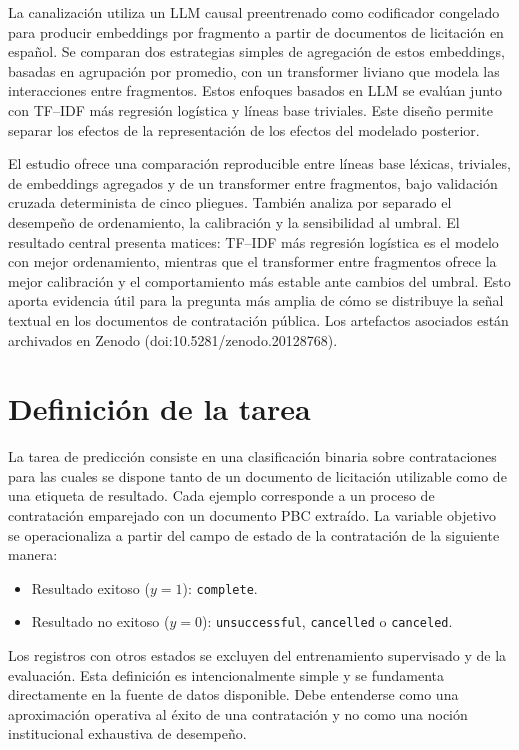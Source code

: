 La canalización utiliza un LLM causal preentrenado como codificador congelado para producir embeddings por fragmento a partir de documentos de licitación en español. Se comparan dos estrategias simples de agregación de estos embeddings, basadas en agrupación por promedio, con un transformer liviano que modela las interacciones entre fragmentos. Estos enfoques basados en LLM se evalúan junto con TF--IDF más regresión logística y líneas base triviales. Este diseño permite separar los efectos de la representación de los efectos del modelado posterior.

El estudio ofrece una comparación reproducible entre líneas base léxicas, triviales, de embeddings agregados y de un transformer entre fragmentos, bajo validación cruzada determinista de cinco pliegues. También analiza por separado el desempeño de ordenamiento, la calibración y la sensibilidad al umbral. El resultado central presenta matices: TF--IDF más regresión logística es el modelo con mejor ordenamiento, mientras que el transformer entre fragmentos ofrece la mejor calibración y el comportamiento más estable ante cambios del umbral. Esto aporta evidencia útil para la pregunta más amplia de cómo se distribuye la señal textual en los documentos de contratación pública. Los artefactos asociados están archivados en Zenodo (doi:10.5281/zenodo.20128768).

\chapter{Definición de la tarea}
La tarea de predicción consiste en una clasificación binaria sobre contrataciones para las cuales se dispone tanto de un documento de licitación utilizable como de una etiqueta de resultado. Cada ejemplo corresponde a un proceso de contratación emparejado con un documento PBC extraído. La variable objetivo se operacionaliza a partir del campo de estado de la contratación de la siguiente manera:

\begin{itemize}
  \item Resultado exitoso ($y=1$): \texttt{complete}.
  \item Resultado no exitoso ($y=0$): \texttt{unsuccessful}, \texttt{cancelled} o \texttt{canceled}.
\end{itemize}

Los registros con otros estados se excluyen del entrenamiento supervisado y de la evaluación. Esta definición es intencionalmente simple y se fundamenta directamente en la fuente de datos disponible. Debe entenderse como una aproximación operativa al éxito de una contratación y no como una noción institucional exhaustiva de desempeño.

